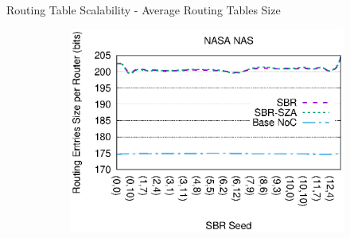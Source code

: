 \begin{frame}{Routing Table Scalability - Average Routing Tables Size}
\begin{center}
\begin{figure}
\begin{subfigure}{0.49\linewidth}
			\end{subfigure}
			\begin{subfigure}{0.49\linewidth}
				\includegraphics[width=1.0\linewidth]{charts/nasa/nasa-routing-tables-bits-bezier.eps}
			\end{subfigure}
		\end{figure}
	\end{center}
\end{frame}

